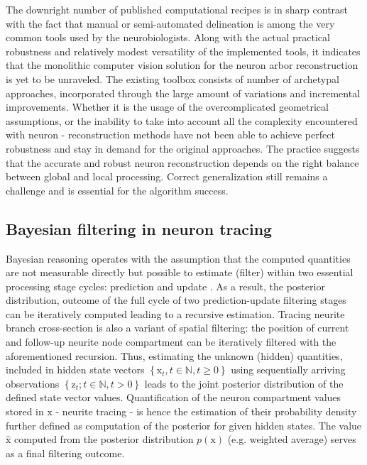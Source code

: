 The downright number of published computational recipes is in sharp contrast with the fact that manual or semi-automated delineation is among the very common tools used by the neurobiologists. Along with the actual practical robustness and relatively modest versatility of the implemented tools, it indicates that the monolithic computer vision solution for the neuron arbor reconstruction is yet to be unraveled. The existing toolbox consists of number of archetypal approaches, incorporated through the large amount of variations and incremental improvements. Whether it is the usage of the overcomplicated geometrical assumptions, or the inability to take into account all the complexity encountered with neuron - reconstruction methods have not been able to achieve perfect robustness and stay in demand for the original approaches. The practice suggests that the accurate and robust neuron reconstruction depends on the right balance between global and local processing. Correct generalization still remains a challenge and is essential for the algorithm success. 

\subsection{Bayesian filtering in neuron tracing}
Bayesian reasoning operates with the assumption that the computed quantities are not measurable directly but possible to estimate (filter) within two essential processing stage cycles: prediction and update \cite{doucet2001introduction}. As a result, the posterior distribution, outcome of the full cycle of two prediction-update filtering stages can be iteratively computed leading to a recursive estimation. Tracing neurite branch cross-section is also a variant of spatial filtering: the position of current and follow-up neurite node compartment can be iteratively filtered with the aforementioned recursion. Thus, estimating the unknown (hidden) quantities, included in hidden state vectors $ \left\lbrace \mathrm{x}_t, t \in \mathbb{N},  t \geq 0 \right\rbrace $ using sequentially arriving observations $ \left\lbrace \mathrm{z}_t; t \in \mathbb{N}, t > 0 \right\rbrace $ leads to the joint posterior distribution of the defined state vector values. Quantification of the neuron compartment values stored in $\mathrm{x}$ - neurite tracing - is hence the estimation of their probability density further defined as computation of the posterior for given hidden states. The value $\hat{\mathrm{x}}$ computed from the posterior distribution $p(\mathrm{x})$ (e.g. weighted average) serves as a final filtering outcome.

